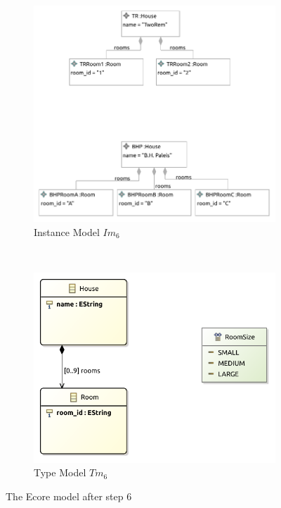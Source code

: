 \begin{figure}[p]
    \centering
    \begin{subfigure}{0.98\textwidth}
        \centering
        \includegraphics{images/06_application/instance_model/step06.pdf}
        \caption{Instance Model $Im_6$}
        \label{fig:application:building_the_model:the_room_size_enumeration_type:ecore:instance_model}
    \end{subfigure}
    \\
    \begin{subfigure}{0.98\textwidth}
        \centering
        \includegraphics{images/06_application/type_model/step06.pdf}
        \caption{Type Model $Tm_6$}
        \label{fig:application:building_the_model:the_room_size_enumeration_type:ecore:type_model}
    \end{subfigure}
    \caption{The Ecore model after step 6}
    \label{fig:application:building_the_model:the_room_size_enumeration_type:ecore}
\end{figure}

